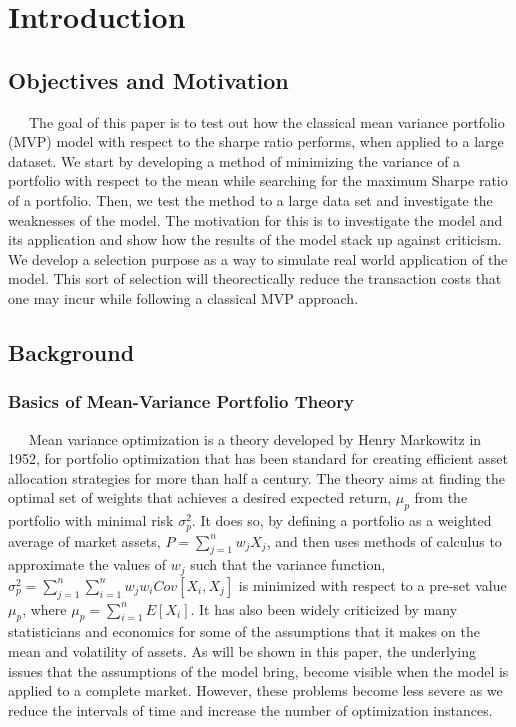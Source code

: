 \documentclass[12pt,titlepage,a4paper]{article}
\begin{document}
\section{Introduction}
\subsection{Objectives and Motivation}
\ \ \ The goal of this paper is to test out how the classical mean variance portfolio (MVP) model with respect to the sharpe ratio performs, when applied to a large dataset. We start by developing a method of minimizing the variance of a portfolio with respect to the mean while searching for the maximum Sharpe ratio of a portfolio. Then, we test the method to a large data set and investigate the weaknesses of the model. The motivation for this is to investigate the model and its application and show how the results of the model stack up against criticism. We develop a selection purpose as a way to simulate real world application of the model. This sort of selection will theorectically reduce the transaction costs that one may incur while following a classical MVP approach. \\ 

\subsection{Background}
\subsubsection{Basics of Mean-Variance Portfolio Theory}
\ \ \  Mean variance optimization is a theory developed by Henry Markowitz in 1952, for portfolio optimization that has been standard for creating efficient asset allocation strategies for more than half a century. The theory aims at finding the optimal set of weights that achieves a desired expected return, $\mu_p$ from the portfolio with minimal risk $\sigma^2_p$. It does so, by defining a portfolio as a weighted average of market assets, $P = \sum_{j=1}^n w_j X_j$, and then uses methods of calculus to approximate the values of $w_j$ such that the variance function, $\sigma_p^2 = \sum_{j=1}^n\sum_{i=1}^nw_jw_iCov[X_i,X_j]$ is minimized with respect to a pre-set value $\mu_p$, where $\mu_p=\sum_{i=1}^nE[X_i]$.  It has also been widely criticized by many statisticians and economics for some of the assumptions that it makes on the mean and volatility of assets. As will be shown in this paper, the underlying issues that the assumptions of the model bring, become visible when the model is applied to a complete market. However, these problems become less severe as we reduce the intervals of time and increase the number of optimization instances.\\
\end{document}
